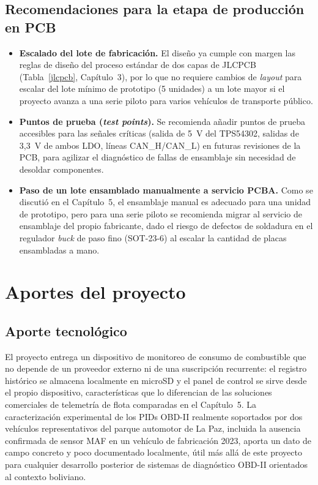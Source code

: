 \subsection{Recomendaciones para la etapa de producción en PCB}

\begin{itemize}
	\item \textbf{Escalado del lote de fabricación.} El diseño ya cumple con margen las reglas de diseño del proceso estándar de dos capas de JLCPCB (Tabla~\ref{jlcpcb}, Capítulo~3), por lo que no requiere cambios de \textit{layout} para escalar del lote mínimo de prototipo (5 unidades) a un lote mayor si el proyecto avanza a una serie piloto para varios vehículos de transporte público.
	\item \textbf{Puntos de prueba (\textit{test points}).} Se recomienda añadir puntos de prueba accesibles para las señales críticas (salida de 5~V del TPS54302, salidas de 3,3~V de ambos LDO, líneas CAN\_H/CAN\_L) en futuras revisiones de la PCB, para agilizar el diagnóstico de fallas de ensamblaje sin necesidad de desoldar componentes.
	\item \textbf{Paso de un lote ensamblado manualmente a servicio PCBA.} Como se discutió en el Capítulo~5, el ensamblaje manual es adecuado para una unidad de prototipo, pero para una serie piloto se recomienda migrar al servicio de ensamblaje del propio fabricante, dado el riesgo de defectos de soldadura en el regulador \textit{buck} de paso fino (SOT-23-6) al escalar la cantidad de placas ensambladas a mano.
\end{itemize}

\section{Aportes del proyecto}

\subsection{Aporte tecnológico}

El proyecto entrega un dispositivo de monitoreo de consumo de combustible que no depende de un proveedor externo ni de una suscripción recurrente: el registro histórico se almacena localmente en microSD y el panel de control se sirve desde el propio dispositivo, características que lo diferencian de las soluciones comerciales de telemetría de flota comparadas en el Capítulo~5. La caracterización experimental de los PIDs OBD-II realmente soportados por dos vehículos representativos del parque automotor de La Paz, incluida la ausencia confirmada de sensor MAF en un vehículo de fabricación 2023, aporta un dato de campo concreto y poco documentado localmente, útil más allá de este proyecto para cualquier desarrollo posterior de sistemas de diagnóstico OBD-II orientados al contexto boliviano.

